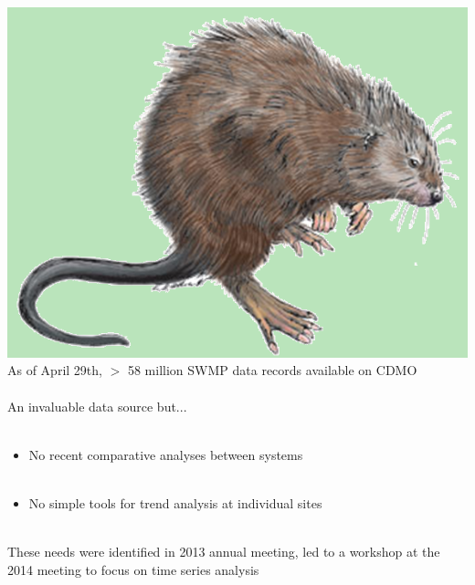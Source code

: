 \documentclass[serif]{beamer}\usepackage[]{graphicx}\usepackage[]{color}
\begin{document}
\begin{frame}{\includegraphics[width=0.05\paperwidth]{fig/muskrat.png}\hspace{0.07in}{\bf Genesis of SWMPrats}}
As of April 29th, $>$ 58 million SWMP data records available on CDMO \\~\\
An invaluable data source but...\\~\\
\begin{itemize}
\item No recent comparative analyses between systems \\~\\
\item No simple tools for trend analysis at individual sites  \\~\\
\end{itemize}
These needs were identified in 2013 annual meeting, led to a workshop at the 2014 meeting to focus on time series analysis
\end{frame}
\end{document}
